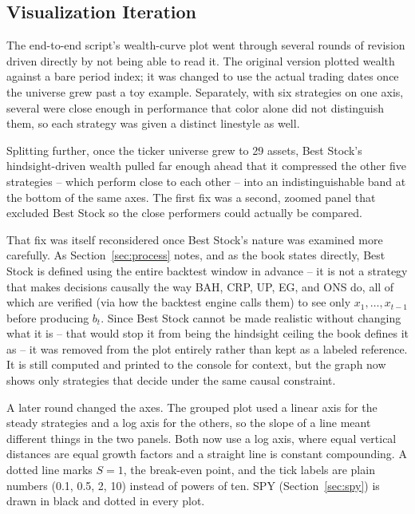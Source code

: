 \documentclass[11pt]{article}
\begin{document}
\subsection{Visualization Iteration}
\label{sec:viz}

The end-to-end script's wealth-curve plot went through several rounds of
revision driven directly by not being able to read it. The original
version plotted wealth against a bare period index; it was changed to use
the actual trading dates once the universe grew past a toy example.
Separately, with six strategies on one axis, several were close enough in
performance that color alone did not distinguish them, so each strategy
was given a distinct linestyle as well.

Splitting further, once the ticker universe grew to 29 assets, Best
Stock's hindsight-driven wealth pulled far enough ahead that it compressed
the other five strategies -- which perform close to each other -- into an
indistinguishable band at the bottom of the same axes. The first fix was
a second, zoomed panel that excluded Best Stock so the close performers
could actually be compared.

\label{sec:beststock}
That fix was itself reconsidered once Best Stock's nature was examined
more carefully. As Section~\ref{sec:process} notes, and as the book states
directly, Best Stock is defined using the entire backtest window in
advance -- it is not a strategy that makes decisions causally the way
BAH, CRP, UP, EG, and ONS do, all of which are verified (via how the
backtest engine calls them) to see only $x_1, \dots, x_{t-1}$ before
producing $b_t$. Since Best Stock cannot be made realistic without
changing what it is -- that would stop it from being the hindsight ceiling
the book defines it as -- it was removed from the plot entirely rather
than kept as a labeled reference. It is still computed and printed to the
console for context, but the graph now shows only strategies that decide
under the same causal constraint.

A later round changed the axes. The grouped plot used a linear axis for
the steady strategies and a log axis for the others, so the slope of a
line meant different things in the two panels. Both now use a log axis,
where equal vertical distances are equal growth factors and a straight
line is constant compounding. A dotted line marks $S=1$, the break-even
point, and the tick labels are plain numbers (0.1, 0.5, 2, 10) instead of
powers of ten. SPY (Section~\ref{sec:spy}) is drawn in black and dotted in
every plot.
\end{document}
